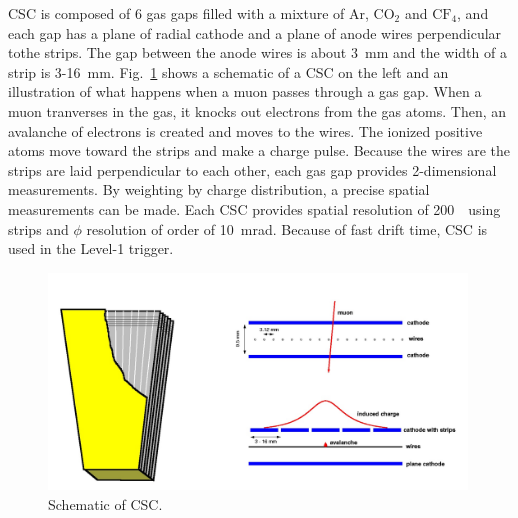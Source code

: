 CSC is composed of 6 gas gaps filled with a mixture of Ar, $\textrm{CO}_2$ and $\textrm{CF}_4$,
and each gap has a plane of radial cathode and a plane of anode wires perpendicular 
tothe strips. The gap between the anode wires is about 3~mm and the width of a strip 
is 3-16~mm. Fig.~\ref{fig:muon_dt} shows a schematic of a CSC on the left 
and an illustration of what happens when a muon passes through a gas gap. 
When a muon tranverses in the gas, it knocks out electrons from the gas atoms. 
Then, an avalanche of electrons is created and moves to the wires.
The ionized positive atoms move toward the strips and make a charge pulse. 
Because the wires are the strips are laid perpendicular to each other, 
each gas gap provides 2-dimensional measurements. 
By weighting by charge distribution, a precise spatial measurements can be made. 
Each CSC provides spatial resolution of 200~\um\ using strips 
and $\phi$ resolution of order of 10~mrad.
Because of fast drift time, CSC is used in the Level-1 trigger. 
%
\begin{figure}[h] 
\centering
\vspace{1cm}
\includegraphics[width=0.99\textwidth]{figures/csc.jpg}
\caption{Schematic of CSC.}
\label{fig:muon_dt} 
\end{figure} 

